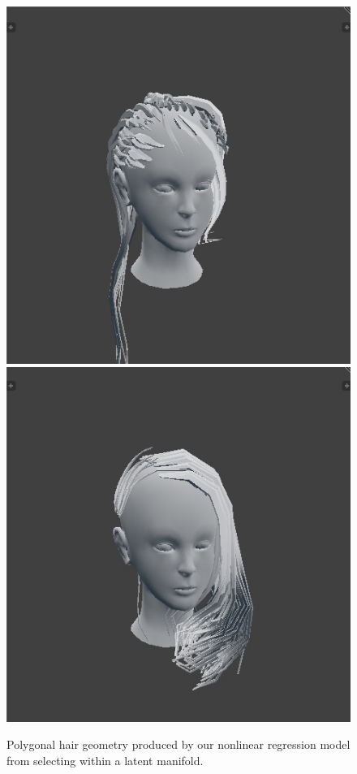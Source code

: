 \documentclass[ %
author={Dillon Keith Diep},
supervisor={Dr. Carl Henrik Ek},
degree={MEng},
title={ART-CG Hair:},
subtitle={Assisted Real-time Content Generation of Stylised Virtual Hair},
type={Research},
year={2017} ]{dissertation}
\begin{document}
	\begin{figure}[!h]
		\centering
		\caption{Polygonal hair geometry produced by our nonlinear regression model from selecting within a latent manifold.}
		\includegraphics[scale=0.25]{images/outputMesh1}
		\includegraphics[scale=0.25]{images/outputMesh2}

\end{figure}
\end{document}
